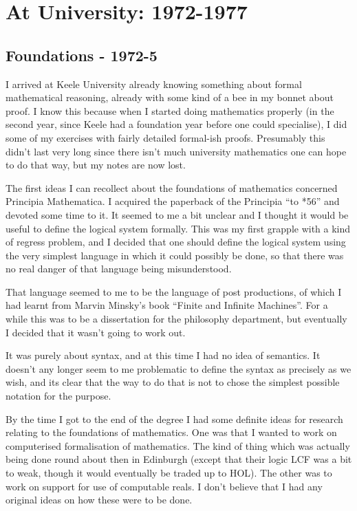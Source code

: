 \documentclass[10pt,titlepage]{book}
\begin{document}
\chapter{At University: 1972-1977}

\section{Foundations - 1972-5}

I arrived at Keele University already knowing something about formal mathematical reasoning, already with some kind of a bee in my bonnet about proof.
I know this because when I started doing mathematics properly (in the second year, since Keele had a foundation year before one could specialise), I did some of my exercises with fairly detailed formal-ish proofs.
Presumably this didn't last very long since there isn't much university mathematics one can hope to do that way, but my notes are now lost.

The first ideas I can recollect about the foundations of mathematics concerned Principia Mathematica.
I acquired the paperback of the Principia ``to *56'' and devoted some time to it.
It seemed to me a bit unclear and I thought it would be useful to define the logical system formally.
This was my first grapple with a kind of regress problem, and I decided that one should define the logical system using the very simplest language in which it could possibly be done, so that there was no real danger of that language being misunderstood.

That language seemed to me to be the language of post productions, of which I had learnt from Marvin Minsky's book ``Finite and Infinite Machines''.
For a while this was to be a dissertation for the philosophy department, but eventually I decided that it wasn't going to work out.

It was purely about syntax, and at this time I had no idea of semantics.
It doesn't any longer seem to me problematic to define the syntax as precisely as we wish, and its clear that the way to do that is not to chose the simplest possible notation for the purpose.

By the time I got to the end of the degree I had some definite ideas for research relating to the foundations of mathematics.
One was that I wanted to work on computerised formalisation of mathematics.
The kind of thing which was actually being done round about then in Edinburgh (except that their logic LCF was a bit to weak, though it would eventually be traded up to HOL).
The other was to work on support for use of computable reals.
I don't believe that I had any original ideas on how these were to be done.
\end{document}
